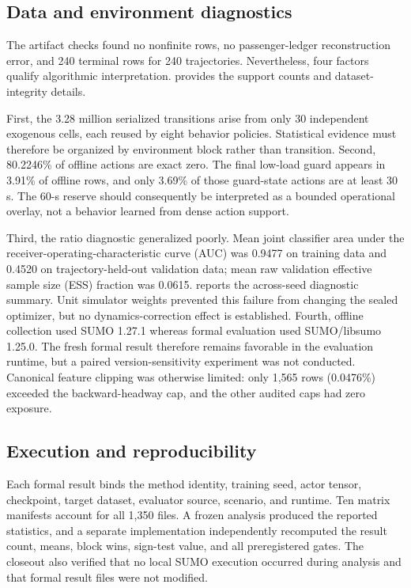 \subsection{Data and environment diagnostics}
\label{sec:exp:validity}

The artifact checks found no nonfinite rows, no passenger-ledger reconstruction
error, and 240 terminal rows for 240 trajectories. Nevertheless, four factors
qualify algorithmic interpretation.  provides the support
counts and dataset-integrity details.

First, the 3.28 million serialized transitions arise from only 30 independent
exogenous cells, each reused by eight behavior policies. Statistical evidence
must therefore be organized by environment block rather than transition.
Second, 80.2246\% of offline actions are exact zero. The final low-load guard
appears in 3.91\% of offline rows, and only 3.69\% of those guard-state actions
are at least 30 s. The 60-s reserve should consequently be interpreted as a
bounded operational overlay, not a behavior learned from dense action support.

Third, the ratio diagnostic generalized poorly. Mean joint classifier area
under the receiver-operating-characteristic curve (AUC) was 0.9477 on training data
and 0.4520 on trajectory-held-out validation data; mean raw validation
effective sample size (ESS) fraction was 0.0615. 
reports the across-seed diagnostic summary. Unit simulator weights prevented
this failure from changing the sealed optimizer, but no dynamics-correction
effect is established. Fourth, offline collection used SUMO 1.27.1 whereas
formal evaluation used SUMO/libsumo 1.25.0. The fresh formal result therefore
remains favorable in the evaluation runtime, but a paired version-sensitivity
experiment was not conducted. Canonical feature clipping was
otherwise limited: only 1,565 rows (0.0476\%) exceeded the backward-headway
cap, and the other audited caps had zero exposure.

\subsection{Execution and reproducibility}
\label{sec:exp:reproducibility}

Each formal result binds the method identity, training seed, actor tensor,
checkpoint, target dataset, evaluator source, scenario, and runtime. Ten matrix
manifests account for all 1,350 files. A frozen analysis produced the reported
statistics, and a separate implementation independently recomputed the result
count, means, block wins, sign-test value, and all preregistered gates. The
closeout also verified that no local SUMO execution occurred during analysis
and that formal result files were not modified.

